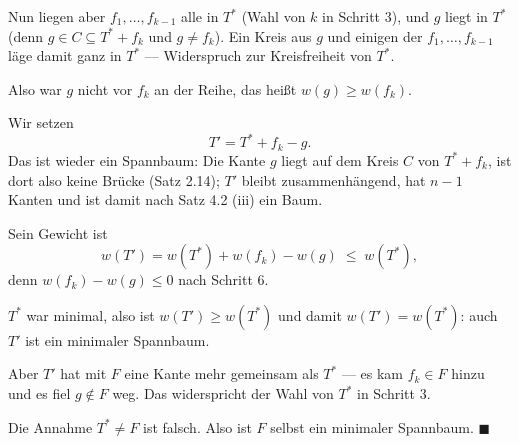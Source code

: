 \begin{merksatz}
Nun liegen aber $f_1, \ldots, f_{k-1}$ alle in $T^{*}$ (Wahl von $k$ in Schritt 3), und $g$ liegt in $T^{*}$ (denn $g \in C \subseteq T^{*} + f_k$ und $g \neq f_k$). Ein Kreis aus $g$ und einigen der $f_1, \ldots, f_{k-1}$ läge damit ganz in $T^{*}$ --- Widerspruch zur Kreisfreiheit von $T^{*}$.

Also war $g$ nicht vor $f_k$ an der Reihe, das heißt $w(g) \ge w(f_k)$.

Wir setzen
\[ T' = T^{*} + f_k - g . \]
Das ist wieder ein Spannbaum: Die Kante $g$ liegt auf dem Kreis $C$ von $T^{*} + f_k$, ist dort also keine Brücke (Satz 2.14); $T'$ bleibt zusammenhängend, hat $n-1$ Kanten und ist damit nach Satz 4.2 (iii) ein Baum.

Sein Gewicht ist
\[ w(T') = w(T^{*}) + w(f_k) - w(g) \;\le\; w(T^{*}), \]
denn $w(f_k) - w(g) \le 0$ nach Schritt 6.

$T^{*}$ war minimal, also ist $w(T') \ge w(T^{*})$ und damit $w(T') = w(T^{*})$: auch $T'$ ist ein minimaler Spannbaum.

Aber $T'$ hat mit $F$ eine Kante mehr gemeinsam als $T^{*}$ --- es kam $f_k \in F$ hinzu und es fiel $g \notin F$ weg. Das widerspricht der Wahl von $T^{*}$ in Schritt 3.

Die Annahme $T^{*} \neq F$ ist falsch. Also ist $F$ selbst ein minimaler Spannbaum. $\blacksquare$
\end{merksatz}

